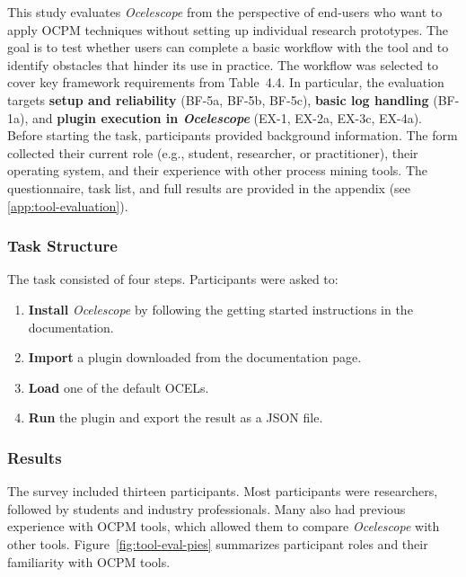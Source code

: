 This study evaluates \textit{Ocelescope} from the perspective of end-users who want to apply OCPM techniques without setting up individual research prototypes.
The goal is to test whether users can complete a basic workflow with the tool and to identify obstacles that hinder its use in practice.
The workflow was selected to cover key framework requirements from Table~4.4. In particular, the evaluation targets \textbf{setup and reliability} (BF-5a, BF-5b, BF-5c), \textbf{basic log handling} (BF-1a), and \textbf{plugin execution in \textit{Ocelescope}} (EX-1, EX-2a, EX-3c, EX-4a). Before starting the task, participants provided background information. The form collected their current role (e.g., student, researcher, or practitioner), their operating system, and their experience with other process mining tools. The questionnaire, task list, and full results are provided in the appendix (see \autoref{app:tool-evaluation}).

\subsubsection{Task Structure}
The task consisted of four steps. Participants were asked to:

\begin{enumerate}
	\item \textbf{Install} \textit{Ocelescope} by following the getting started instructions in the documentation.
	\item \textbf{Import} a plugin downloaded from the documentation page.
	\item \textbf{Load} one of the default OCELs.
	\item \textbf{Run} the plugin and export the result as a JSON file.
\end{enumerate}

\subsubsection{Results}

The survey included thirteen participants.
Most participants were researchers, followed by students and industry professionals.
Many also had previous experience with OCPM tools, which allowed them to compare \textit{Ocelescope} with other tools.
Figure~\ref{fig:tool-eval-pies} summarizes participant roles and their familiarity with OCPM tools.

